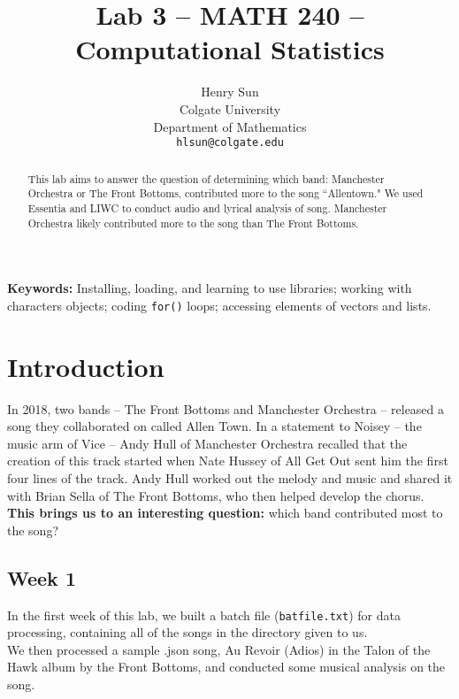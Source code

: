 \documentclass{article}\usepackage[]{graphicx}\usepackage[]{xcolor}
\begin{document}
\vspace{-1in}
\title{Lab 3 -- MATH 240 -- Computational Statistics}

\author{
  Henry Sun \\
  Colgate University  \\
  Department of Mathematics  \\
  {\tt hlsun@colgate.edu}
}

\date{}

\maketitle

\begin{multicols}{2}
\begin{abstract}
This lab aims to answer the question of determining which band: Manchester Orchestra or The Front Bottoms, contributed more to the song ``Allentown." We used Essentia and LIWC to conduct audio and lyrical analysis of song. Manchester Orchestra likely contributed more to the song than The Front Bottoms.
\end{abstract}

\noindent \textbf{Keywords:} Installing, loading, and learning to use libraries; working with characters objects; coding \texttt{for()} loops; accessing elements of vectors and lists.

\section{Introduction}
\indent  
In 2018, two bands -- The Front Bottoms and Manchester Orchestra -- released a song they collaborated on called Allen Town. In a statement to Noisey \citep{vice} -- the music arm of Vice -- Andy Hull of Manchester Orchestra recalled that the creation of this track started when Nate Hussey of All Get
 Out sent him the first four lines of the track. Andy Hull worked out the melody and music and shared it with Brian Sella of The Front Bottoms, who then helped develop the chorus. \\

\noindent
\textbf{This brings us to an interesting question:} which band contributed most to the song?


\subsection{Week 1}
\indent In the first week of this lab, we built a batch file (\texttt{batfile.txt}) for data processing, containing all of the songs in the directory given to us. \\
\indent We then processed a sample .json song, Au Revoir (Adios) in the Talon of the Hawk album by the Front Bottoms, and conducted some musical analysis on the song. 


\end{multicols}
\end{document}
